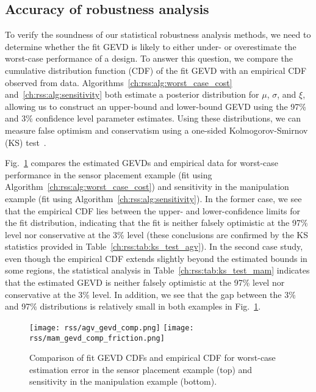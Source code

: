 \subsection{Accuracy of robustness analysis}\label{ch:rss:soundness}

To verify the soundness of our statistical robustness analysis methods, we need to determine whether the fit GEVD is likely to either under- or overestimate the worst-case performance of a design. To answer this question, we compare the cumulative distribution function (CDF) of the fit GEVD with an empirical CDF observed from data. Algorithms~\ref{ch:rss:alg:worst_case_cost} and~\ref{ch:rss:alg:sensitivity} both estimate a posterior distribution for $\mu$, $\sigma$, and $\xi$, allowing us to construct an upper-bound and lower-bound GEVD using the 97\% and 3\% confidence level parameter estimates. Using these distributions, we can measure false optimism and conservatism using a one-sided Kolmogorov-Smirnov (KS) test~\cite{nist_ks}.

Fig.~\ref{ch:rss:fig:ks_test} compares the estimated GEVDs and empirical data for worst-case performance in the sensor placement example (fit using Algorithm~\ref{ch:rss:alg:worst_case_cost}) and sensitivity in the manipulation example (fit using Algorithm~\ref{ch:rss:alg:sensitivity}). In the former case, we see that the empirical CDF lies between the upper- and lower-confidence limits for the fit distribution, indicating that the fit is neither falsely optimistic at the 97\% level nor conservative at the 3\% level (these conclusions are confirmed by the KS statistics provided in Table~\ref{ch:rss:tab:ks_test_agv}). In the second case study, even though the empirical CDF extends slightly beyond the estimated bounds in some regions, the statistical analysis in Table~\ref{ch:rss:tab:ks_test_mam} indicates that the estimated GEVD is neither falsely optimistic at the 97\% level nor conservative at the 3\% level. In addition, we see that the gap between the 3\% and 97\% distributions is relatively small in both examples in Fig.~\ref{ch:rss:fig:ks_test}.

\begin{figure}[tb]
    \centering
    \texttt{[image: rss/agv\_gevd\_comp.png]}
    \texttt{[image: rss/mam\_gevd\_comp\_friction.png]}
    \caption{Comparison of fit GEVD CDFs and empirical CDF for worst-case estimation error in the sensor placement example (top) and sensitivity in the manipulation example (bottom).}
    \label{ch:rss:fig:ks_test}
\end{figure}


